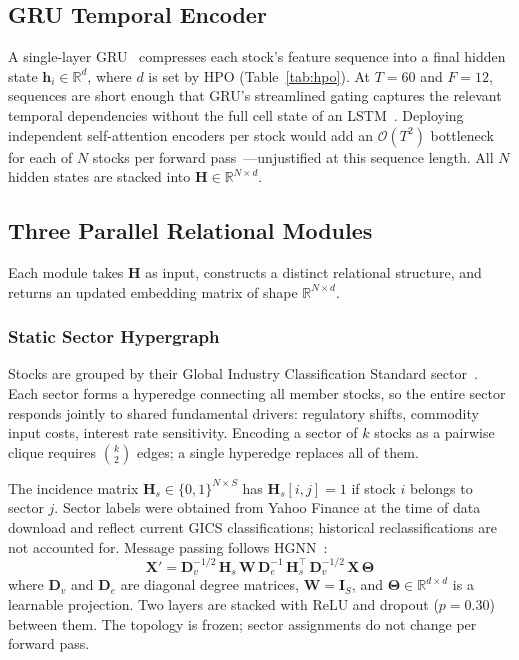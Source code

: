 \documentclass[journal]{IEEEtran}
\begin{document}
\subsection{GRU Temporal Encoder}

A single-layer GRU~\cite{cho2014learning} compresses each stock's
feature sequence into a final hidden state $\mathbf{h}_i\in\mathbb{R}^{d}$,
where $d$ is set by HPO (Table~\ref{tab:hpo}). At $T=60$ and $F=12$,
sequences are short enough that GRU's streamlined gating captures the
relevant temporal dependencies without the full cell state of an
LSTM~\cite{chung2014empirical}. Deploying independent self-attention
encoders per stock would add an $\mathcal{O}(T^2)$ bottleneck for each
of $N$ stocks per forward pass~\cite{vaswani2017attention}---unjustified
at this sequence length. All $N$ hidden states are stacked into
$\mathbf{H}\in\mathbb{R}^{N\times d}$.

\subsection{Three Parallel Relational Modules}

Each module takes $\mathbf{H}$ as input, constructs a distinct relational
structure, and returns an updated embedding matrix of shape
$\mathbb{R}^{N\times d}$.

\subsubsection{Static Sector Hypergraph}

Stocks are grouped by their Global Industry Classification Standard
sector~\cite{msci2023gics}. Each sector forms a hyperedge connecting
all member stocks, so the entire sector responds jointly to shared
fundamental drivers: regulatory shifts, commodity input costs, interest
rate sensitivity. Encoding a sector of $k$ stocks as a pairwise clique
requires $\binom{k}{2}$ edges; a single hyperedge replaces all of them.

The incidence matrix $\mathbf{H}_s\in\{0,1\}^{N\times S}$ has
$\mathbf{H}_s[i,j]=1$ if stock $i$ belongs to sector $j$. Sector labels
were obtained from Yahoo Finance at the time of data download and
reflect current GICS classifications; historical reclassifications are
not accounted for. Message passing follows HGNN~\cite{feng2019hypergraph}:
\begin{equation}
  \mathbf{X}' = \mathbf{D}_v^{-1/2}\,\mathbf{H}_s\,\mathbf{W}\,
                \mathbf{D}_e^{-1}\,\mathbf{H}_s^\top\,
                \mathbf{D}_v^{-1/2}\,\mathbf{X}\,\boldsymbol{\Theta}
  \label{eq:hgnn_static}
\end{equation}
where $\mathbf{D}_v$ and $\mathbf{D}_e$ are diagonal degree matrices,
$\mathbf{W}=\mathbf{I}_S$, and
$\boldsymbol{\Theta}\in\mathbb{R}^{d\times d}$ is a learnable
projection. Two layers are stacked with ReLU and dropout ($p=0.30$)
between them. The topology is frozen; sector assignments do not change
per forward pass.
\end{document}
